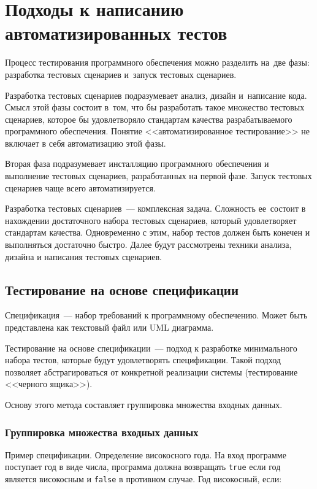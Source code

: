 \section{Подходы к написанию автоматизированных тестов} 

Процесс тестирования программного обеспечения можно разделить на~две фазы: разработка тестовых сценариев и~запуск тестовых сценариев. 

Разработка тестовых сценариев подразумевает анализ, дизайн и~написание кода. Смысл этой фазы состоит в~том, что бы разработать такое множество тестовых сценариев, которое бы удовлетворяло стандартам качества разрабатываемого программного обеспечения. Понятие <<автоматизированное тестирование>> не включает в себя автоматизацию этой фазы.

Вторая фаза подразумевает инсталляцию программного обеспечения и выполнение тестовых сценариев, разработанных на первой фазе. Запуск тестовых сценариев чаще всего автоматизируется. 


Разработка тестовых сценариев~--- комплексная задача. Сложность ее~состоит в нахождении достаточного набора тестовых сценариев, который удовлетворяет стандартам качества. Одновременно с этим, набор тестов должен быть конечен и выполняться достаточно быстро. Далее будут рассмотрены техники анализа, дизайна и написания тестовых сценариев.


\subsection{Тестирование на основе спецификации} 

Спецификация~--- набор требований к программному обеспечению. Может быть представлена как текстовый файл или UML диаграмма.

Тестирование на основе спецификации~--- подход к разработке минимального набора тестов, которые будут удовлетворять спецификации. Такой подход позволяет абстрагироваться от конкретной реализации системы (тестирование <<черного ящика>>).

Основу этого метода составляет группировка множества входных данных.

 \subsubsection{Группировка множества входных данных}

Пример спецификации. Определение високосного года. На вход программе поступает год в виде числа, программа должна возвращать \texttt{true} если год является високосным и \texttt{false} в противном случае. Год високосный, если:

